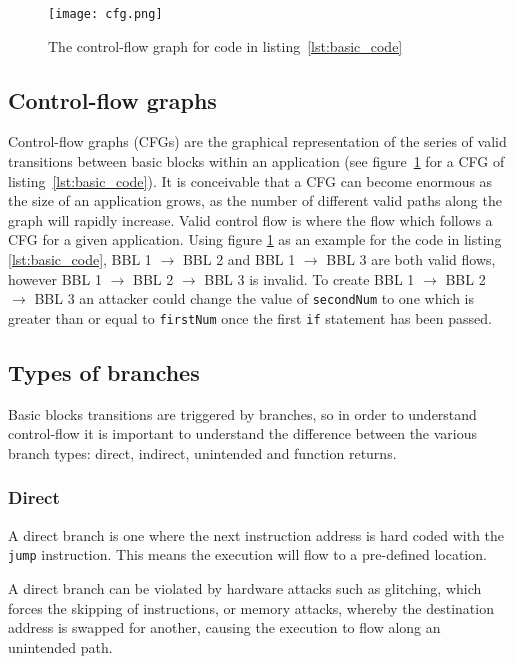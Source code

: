 \begin{figure}
  \centering
  \vspace*{0.5in}
  \texttt{[image: cfg.png]}
  \caption{The control-flow graph for code in listing~\ref{lst:basic_code}}
  \label{fig:basicCFG}
\end{figure}

\subsection{Control-flow graphs}
Control-flow graphs (CFGs) are the graphical representation of the series of valid transitions between basic blocks within an application (see figure~\ref{fig:basicCFG} for a CFG of listing~\ref{lst:basic_code}). It is conceivable that a CFG can become enormous as the size of an application grows, as the number of different valid paths along the graph will rapidly increase. Valid control flow is where the flow which follows a CFG for a given application. Using figure \ref{fig:basicCFG} as an example for the code in listing \ref{lst:basic_code}, BBL 1 $\rightarrow$ BBL 2 and BBL 1 $\rightarrow$ BBL 3 are both valid flows, however BBL 1 $\rightarrow$ BBL 2 $\rightarrow$ BBL 3 is invalid. To create BBL 1 $\rightarrow$ BBL 2 $\rightarrow$ BBL 3 an attacker could change the value of \verb|secondNum| to one which is greater than or equal to \verb|firstNum| once the first \verb|if| statement has been passed. 

\subsection{Types of branches}
Basic blocks transitions are triggered by branches, so in order to understand control-flow it is important to understand the difference between the various branch types: direct, indirect, unintended and function returns.

\subsubsection*{Direct}
A direct branch is one where the next instruction address is hard coded with the \verb|jump| instruction. This means the execution will flow to a pre-defined location.

A direct branch can be violated by hardware attacks such as glitching, which forces the skipping of instructions, or memory attacks, whereby the destination address is swapped for another, causing the execution to flow along an unintended path.

